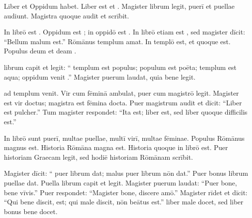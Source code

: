 \documentclass[12pt]{nextbook}
\begin{document}
\begin{readersection}{Liber et Oppidum}
  habet. Liber est  et . Magister librum legit, puerī et puellae audiunt. Magistra quoque audit et scrībit.

In librō est . Oppidum est ; in oppidō est . In librō etiam est , sed magister dīcit: “Bellum malum est.”  Rōmānus templum amat. In templō  est, et  quoque est. Populus deum et deam .

 librum capit et legit: “ templum est populus;  populum est poēta;  templum est aqua;  oppidum venit .” Magister puerum laudat, quia bene legit.

 ad templum venit. Vir cum fēminā ambulat, puer cum magistrō legit. Magister est vir doctus; magistra est fēmina docta. Puer magistrum audit et dīcit: “Liber est pulcher.” Tum magister respondet: “Ita est; liber  est, sed liber quoque difficilis est.”

In librō sunt  puerī, multae puellae, multī virī, multae fēminae. Populus Rōmānus magnus est. Historia Rōmāna magna est. Historia  quoque in librō est. Puer historiam Graecam legit, sed hodiē historiam Rōmānam scrībit.

Magister dīcit: “ puer librum dat; malus puer librum nōn dat.” Puer bonus librum puellae dat. Puella librum capit et legit. Magister puerum laudat: “Puer bone, bene vīvis.” Puer respondet: “Magister bone, discere amō.” Magister rīdet et dīcit: “Qui bene discit,  est; qui male discit, nōn beātus est.”  liber male docet, sed liber bonus bene docet.

\end{readersection}
\end{document}
